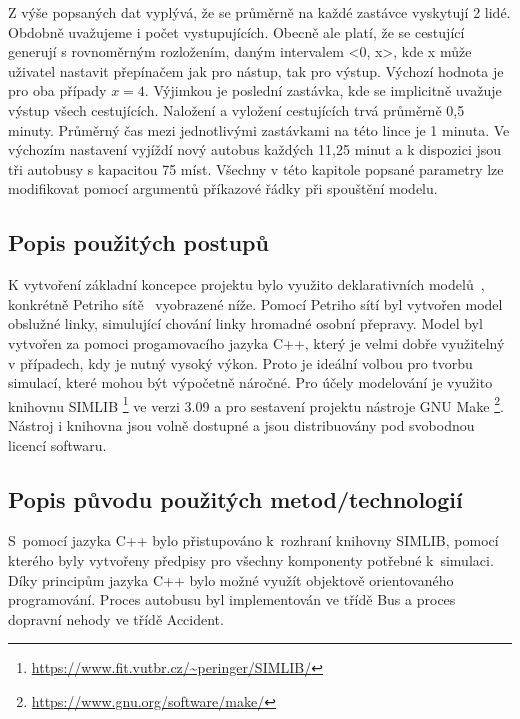 \documentclass[a4paper]{article}
\begin{document}
 		Z výše popsaných dat vyplývá, že se průměrně na každé zastávce vyskytují 2 lidé. Obdobně uvažujeme i počet vystupujících. Obecně ale platí, že se cestující generují s rovnoměrným rozložením, daným intervalem <0, x>, kde x může uživatel nastavit přepínačem jak pro nástup, tak pro výstup. Výchozí hodnota je pro oba případy $x = 4$. Výjimkou je poslední zastávka, kde se implicitně uvažuje výstup všech cestujících.
 		Naložení a vyložení cestujících trvá průměrně 0,5 minuty. Průměrný čas mezi jednotlivými zastávkami na této lince je 1 minuta. 
 		Ve výchozím nastavení vyjíždí nový autobus každých 11,25 minut a k dispozici jsou tři autobusy s kapacitou 75 míst.  Všechny v této kapitole popsané parametry lze modifikovat pomocí argumentů příkazové řádky při spouštění modelu.
     
        \subsection{Popis použitých postupů}
        \label{subsec:methods}

            K vytvoření základní koncepce projektu bylo využito deklarativních modelů~\cite[snímek 49]{IMS_slides}, konkrétně Petriho sítě~\cite[snímek 123]{IMS_slides} vyobrazené níže.
            Pomocí Petriho sítí byl vytvořen model obslužné linky, simulující chování linky hromadné osobní přepravy. Model byl vytvořen za pomoci progamovacího jazyka C++, který je velmi dobře využitelný v případech, kdy je nutný vysoký výkon. Proto je ideální volbou pro tvorbu simulací, které mohou být výpočetně náročné. Pro účely modelování je využito knihovnu SIMLIB \footnote{\url{https://www.fit.vutbr.cz/~peringer/SIMLIB/}} ve verzi 3.09 a pro sestavení projektu nástroje GNU Make \footnote{\url{https://www.gnu.org/software/make/}}. Nástroj i knihovna jsou volně dostupné a jsou distribuovány pod svobodnou licencí softwaru.
            
        \subsection{Popis původu použitých metod/technologií}
        \label{subsec:techology}

			S~pomocí jazyka C++ bylo přistupováno k~rozhraní knihovny SIMLIB, pomocí kterého byly vytvořeny předpisy pro všechny komponenty potřebné k~simulaci. Díky principům jazyka C++ bylo možné využít objektově orientovaného programování. Proces autobusu byl implementován ve třídě Bus a proces dopravní nehody ve třídě Accident.
\end{document}
